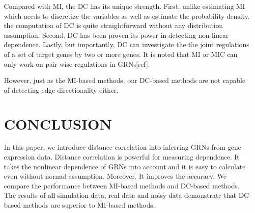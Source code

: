 \documentclass{bioinfo}
\begin{document}
Compared with MI, the DC has its unique strength. First, unlike
estimating MI which needs to discretize the variables as well as
estimate the probability density, the computation of DC is quite
straightforward without any distribution assumption. Second, DC has
been proven its power in detecting non-linear dependence. Lastly,
but importantly, DC can investigate the the joint regulations of a
set of target genes by two or more genes. It is noted that MI or MIC
can only work on pair-wise regulations in GRNs[ref].

However, just as the MI-based methods, our DC-based methods are not
capable of detecting edge directionality either.


\section{CONCLUSION}
In this paper, we introduce distance correlation into inferring GRNs
from gene expression data. Distance correlation is powerful for
measuring dependence. It takes the nonlinear dependence of GRNs into
account and it is easy to calculate even without normal assumption.
Moreover, It improves the accuracy. We compare the performance
between MI-based methods and DC-based methods. The results of all
simulation data, real data and noisy data demonstrate that DC-based
methods are superior to MI-based methods.


%
%
%
%
%
%


\end{document}
